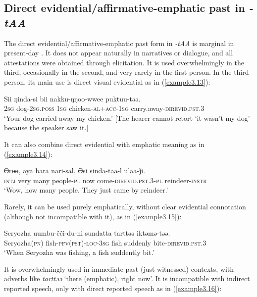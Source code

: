\documentclass[output=paper,colorlinks,citecolor=brown]{langscibook}
\begin{document}
\subsection{Direct evidential/affirmative-emphatic past in \textit{-tAA}}\label{Section3.3.3}

The direct evidential/affirmative-emphatic past form in \textit{-tAA} is marginal in pres\-ent-day . It does not appear naturally in narratives or dialogue, and all attestations were obtained through elicitation. It is used overwhelmingly in the third, occasionally in the second, and very rarely in the first person. In the third person, its main use is direct visual evidential as in (\ref{example3.13}):

\ea
\label{example3.13}
\gll Sii	ŋinda-si			bii	nakku-ŋŋoo-wwee		puktuu-təə.\\
     	\textsc{2sg}	dog-\textsc{2sg}.\textsc{poss}		\textsc{1sg}	chicken-\textsc{al}+\textsc{acc}-\textsc{1sg}	carry.away-\textsc{direvid}.\textsc{pst}.\textsc{3}\\
\glt `Your dog carried away my chicken.’ [The hearer cannot retort ‘it wasn’t my dog’ because the speaker saw it.]
\z

It can also combine direct evidential with emphatic meaning as in (\ref{example3.14}):

\ea
\label{example3.14}
\gll Ɵrɵɵ,	aya		bara	nari-sal. 		Əsi		sinda-taa-l				ulaa-ǰi.\\
     	\textsc{intj}		very		many	people-\textsc{pl}	now		come-\textsc{direvid}.\textsc{pst}.\textsc{3}-\textsc{pl}	reindeer-\textsc{instr}\\
\glt `Wow, how many people. They just came by reindeer.’
\z

Rarely, it can be used purely emphatically, without clear evidential connotation (although not incompatible with it), as in (\ref{example3.15}):

\ea
\label{example3.15}
\gll Seryozha			uumbu-čči-du-ni		sundatta		tarttəə		iktəmə-təə.\\
     	Seryozha(\textsc{pn})		fish-\textsc{pfv(pst)}-\textsc{loc}-\textsc{3sg}		fish			suddenly		bite-\textsc{direvid}.\textsc{pst}.\textsc{3}\\
\glt `When Seryozha was fishing, a fish suddently bit.’
\z

It is overwhelmingly used in immediate past (just witnessed) contexts, with adverbs like \textit{tarttəə} ‘there (emphatic), right now’. It is incompatible with indirect reported speech, only with direct reported speech as in (\ref{example3.16}):
\end{document}
